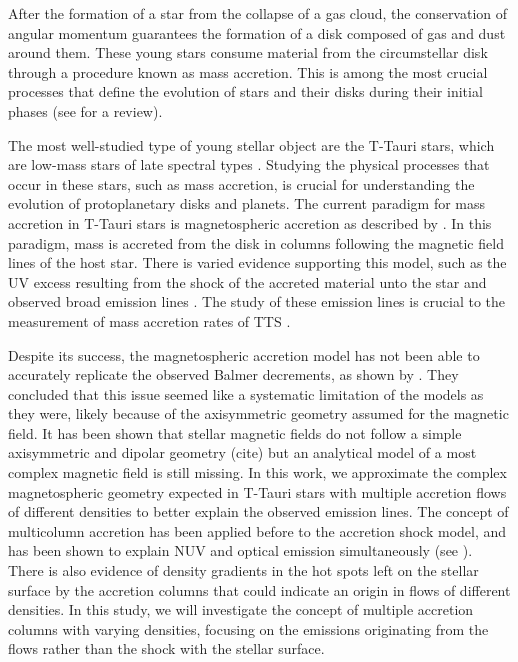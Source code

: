 \documentclass[twocolumn,linenumbers]{aastex631}
\begin{document}
After the formation of a star from the collapse of a gas cloud, the conservation of angular momentum guarantees the formation of a disk composed of gas and dust around them. These young stars consume material from the circumstellar disk through a procedure known as mass accretion. This is among the most crucial processes that define the evolution of stars and their disks during their initial phases (see \citet{hartmann2016} for a review).

The most well-studied type of young stellar object are the T-Tauri stars, which  are low-mass stars of late spectral types \citep{hartmann2016}. Studying the physical processes that occur in these stars, such as mass accretion, is crucial for understanding the evolution of protoplanetary disks and planets. The current paradigm for mass accretion in T-Tauri stars is magnetospheric accretion as described by \citet{hartmann2016}. In this paradigm, mass is accreted from the disk in columns following the magnetic field lines of the host star. There is varied evidence supporting this model, such as the UV excess resulting from the shock of the accreted material unto the star \citep{calvet_gullbring1998} and observed broad emission lines \citep{muzerolle2001}. The study of these emission lines is crucial to the measurement of mass accretion rates of TTS \citep{hartmann1994, muzerolle1998a, muzerolle1998b, muzerolle2001}.


Despite its success, the magnetospheric accretion model has not been able to accurately replicate the observed Balmer decrements, as shown by \citet{micolta2023}. They concluded that this issue seemed like a systematic limitation of the models as they were, likely because of the axisymmetric geometry assumed for the magnetic field. It has been shown that stellar magnetic fields do not follow a simple axisymmetric and dipolar geometry (cite) but an analytical model of a most complex magnetic field is still missing. In this work, we approximate the complex magnetospheric geometry expected in T-Tauri stars with multiple accretion flows of different densities to better explain the observed emission lines. The concept of multicolumn accretion has been applied before to the accretion shock model, and has been shown to explain NUV and optical emission simultaneously (see \citet{ingleby2013, pittman2022}). There is also evidence of density gradients in the hot spots left on the stellar surface by the accretion columns \citep{espaillat2021} that could indicate an origin in flows of different densities. In this study, we will investigate the concept of multiple accretion columns with varying densities, focusing on the emissions originating from the flows rather than the shock with the stellar surface.
\end{document}
